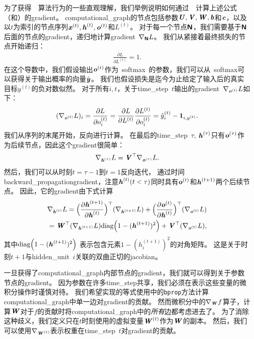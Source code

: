 为了获得~~算法行为的一些直观理解，我们举例说明如何通过~~计算上述公式（和）的\gls{gradient}。
\gls{computational_graph}的节点包括参数$\boldsymbol{\mathit{U}},\boldsymbol{\mathit{V}},\boldsymbol{\mathit{W}}, \boldsymbol{\mathit{b}}$和$\boldsymbol{\mathit{c}}$，以及以$t$为索引的节点序列$\boldsymbol{\mathit{x}}^{(t)}, \boldsymbol{\mathit{h}}^{(t)},\boldsymbol{\mathit{o}}^{(t)}$和$L^{(t)}$。
对于每一个节点$\textsf{\textbf{N}}$，我们需要基于$\textsf{\textbf{N}}$后面的节点的\gls{gradient}，递归地计算\gls{gradient}~$\nabla_{\textsf{\textbf{N}}} L$。
我们从紧接着最终损失的节点开始递归：
\begin{align}
 \frac{\partial L}{\partial L^{(t)}} = 1.
\end{align}
在这个导数中，我们假设输出$\boldsymbol{\mathit{o}}^{(t)}$作为~\gls{softmax}~的参数，我们可以从~\gls{softmax}可以获得关于输出概率的向量$\hat{\boldsymbol{\mathit{y}}}$。
我们也假设损失是迄今为止给定了输入后的真实目标$y^{(t)}$的负对数似然。
对于所有$i,t$，关于\gls{time_step}~$t$输出的\gls{gradient}~$\nabla_{\boldsymbol{\mathit{o}}^{(t)}} L$如下：
\begin{align}
 (\nabla_{\boldsymbol{\mathit{o}}^{(t)}} L)_i =  \frac{\partial L}{\partial o_i^{(t)}} 
 =  \frac{\partial L}{\partial L^{(t)}}  \frac{\partial L^{(t)}}{\partial o_i^{(t)}}  
 = \hat y_i^{(t)} - \mathbf{1}_{i,y^{(t)}}.
\end{align}
我们从序列的末尾开始，反向进行计算。
在最后的\gls{time_step}~$\tau$, $\boldsymbol{\mathit{h}}^{(\tau)}$只有$\boldsymbol{\mathit{o}}^{(\tau)}$作为后续节点，因此这个\gls{gradient}很简单：
\begin{align}
 \nabla_{\boldsymbol{\mathit{h}}^{(\tau)}} L = \boldsymbol{\mathit{V}}^\top \nabla_{\boldsymbol{\mathit{o}}^{(\tau)}} L.
\end{align}
然后，我们可以从时刻$t=\tau-1$到$t=1$反向迭代， 通过时间\gls{backward_propagation}\gls{gradient}，注意$\boldsymbol{\mathit{h}}^{(t)}(t < \tau)$同时具有$\boldsymbol{\mathit{o}}^{(t)}$和$\boldsymbol{\mathit{h}}^{(t+1)}$两个后续节点。
因此，它的\gls{gradient}由下式计算
\begin{align}
  \nabla_{\boldsymbol{\mathit{h}}^{(t)}} L = \Big( \frac{\partial \boldsymbol{\mathit{h}}^{(t+1)}}{ \partial \boldsymbol{\mathit{h}}^{(t)}}  \Big)^\top(\nabla_{\boldsymbol{\mathit{h}}^{(t+1)}} L) 
  + \Big( \frac{\partial \boldsymbol{\mathit{o}}^{(t)}}{ \partial \boldsymbol{\mathit{h}}^{(t)}}  \Big)^\top (\nabla_{\boldsymbol{\mathit{o}}^{(t)}} L) \\
  = \boldsymbol{\mathit{W}}^\top (\nabla_{\boldsymbol{\mathit{h}}^{(t+1)}} L) \text{diag} \Big( 1 - (\boldsymbol{\mathit{h}}^{(t+1)})^2 \Big) 
    + \boldsymbol{\mathit{V}}^\top ( \nabla_{\boldsymbol{\mathit{o}}^{(t)}} L ),
\end{align}
其中$\text{diag} \Big( 1 - (\boldsymbol{\mathit{h}}^{(t+1)})^2 \Big) $ 表示包含元素$1 - (h_i^{(t+1)})^2$的对角矩阵。
这是关于时刻$t+1$与\gls{hidden_unit}~$i$关联的双曲正切的\gls{jacobian}。


一旦获得了\gls{computational_graph}内部节点的\gls{gradient}，我们就可以得到关于参数节点的\gls{gradient}。
因为参数在许多\gls{time_step}共享，我们必须在表示这些变量的微积分操作时谨慎对待。
我们希望实现的等式使用中的{\tt bprop}方法计算\gls{computational_graph}中单一边对\gls{gradient}的贡献。
然而微积分中的$\nabla_{\boldsymbol{\mathit{W}}} f$算子，计算$\boldsymbol{\mathit{W}}$对于$f$的贡献时将\gls{computational_graph}中的\emph{所有}边都考虑进去了。
为了消除这种歧义，我们定义只在$t$时刻使用的虚拟变量$\boldsymbol{\mathit{W}}^{(t)}$作为$\boldsymbol{\mathit{W}}$的副本。
然后，我们可以使用$\nabla_{\boldsymbol{\mathit{W}}^{(t)}}$表示权重在\gls{time_step}~$t$对\gls{gradient}的贡献。

